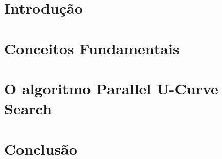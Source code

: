 \documentclass[12pt, twoside]{report}
\numberwithin{mydefinition}{section}
\numberwithin{mytheorem}{section}
\begin{document}
\tableofcontents

\clearpage
{} 

\nocite{*}
\chapter{Introdução}


\chapter{Conceitos Fundamentais}


\chapter{O algoritmo Parallel U-Curve Search}


\chapter{Conclusão}


\newpage
\printbibliography
\end{document}
